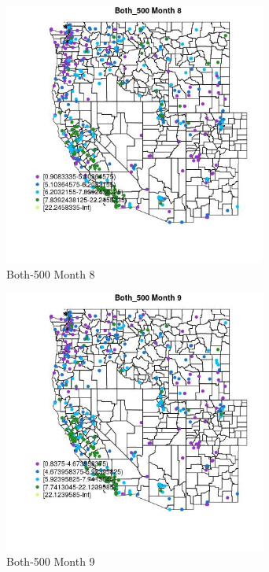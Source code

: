 \begin{figure} 
\centering  
\includegraphics[width=0.77\textwidth]{Code_Outputs/ML_input_report_ML_input_PM25_Step5_part_d_de_duplicated_aves_ML_input_MapObsMo8Both_500.jpg} 
\caption{\label{fig:ML_input_report_ML_input_PM25_Step5_part_d_de_duplicated_aves_ML_inputMapObsMo8Both_500}Both-500 Month 8} 
\end{figure} 
 

\begin{figure} 
\centering  
\includegraphics[width=0.77\textwidth]{Code_Outputs/ML_input_report_ML_input_PM25_Step5_part_d_de_duplicated_aves_ML_input_MapObsMo9Both_500.jpg} 
\caption{\label{fig:ML_input_report_ML_input_PM25_Step5_part_d_de_duplicated_aves_ML_inputMapObsMo9Both_500}Both-500 Month 9} 
\end{figure} 
 

